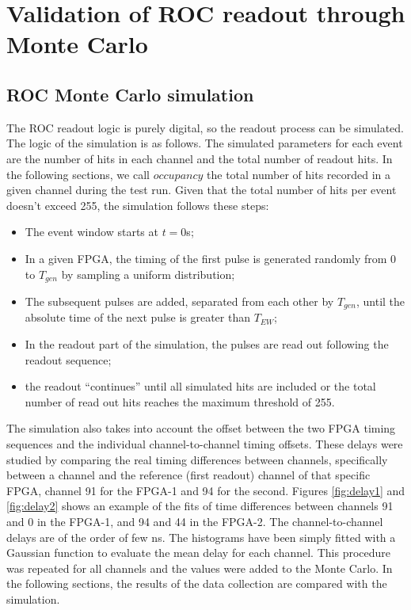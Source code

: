\section{Validation of ROC readout through Monte Carlo}
\subsection{ROC Monte Carlo simulation}\label{MonteCarlo}
 
The ROC readout logic is purely digital, so the readout process can be simulated. 
The logic of the simulation is as follows. The simulated parameters for each event are the number of hits in each channel
and the total number of readout hits. In the following sections, we call $occupancy$ the total number of hits
recorded in a given channel during the test run. Given that the total number of hits per event doesn't exceed 255, the simulation follows these steps:
\begin{itemize}
\item
  The event window starts at $t=0$s;
\item
  In a given FPGA, the timing of the first pulse is generated randomly from 0 to $T_{gen}$
  by sampling a uniform distribution;
\item
  The subsequent pulses are added, separated from each other by $T_{gen}$,
  until the absolute time
  of the next pulse is greater than $T_{EW}$;
\item
  In the readout part of the simulation, the pulses are read out following the readout sequence;
\item
  the readout ``continues'' until all simulated hits are included or
  the total number of read out hits reaches the maximum threshold of 255. 
\end{itemize}

The simulation also takes into account the offset between the two FPGA timing sequences and the 
individual channel-to-channel timing offsets. These delays were studied by comparing the real timing 
differences between channels, specifically between a channel and the reference (first readout) channel of that 
specific FPGA, channel 91 for the FPGA-1 and 94 for the second. Figures \ref{fig:delay1} and \ref{fig:delay2} 
shows an example of the fits of time differences between channels 91 and 0 in the FPGA-1, and 94 and 44 in the FPGA-2. 
The channel-to-channel delays are of the order of few ns. The histograms have been simply fitted with a Gaussian function 
to evaluate the mean delay for each channel. This procedure was repeated for all channels and the values were added to the Monte Carlo.
In the following sections, the results of the data collection are compared with the simulation.

